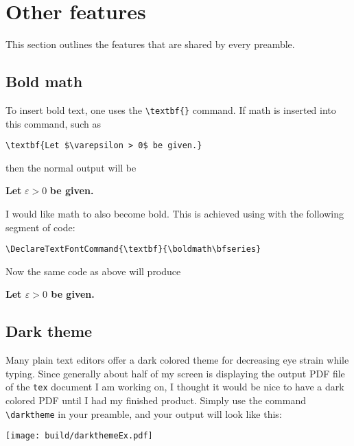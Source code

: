 \documentclass[letterpaper,12pt]{article}
\begin{document}
\section{Other features}
This section outlines the features that are shared by every preamble.

	\subsection{Bold math}
	To insert bold text, one uses the \verb|\textbf{}| command. If math is inserted into this command, such as
	
	\begin{Verbatim}[frame=single,gobble=1,fontsize=\small]
	\textbf{Let $\varepsilon > 0$ be given.}
	\end{Verbatim}
	
	then the normal output will be
	
	\begin{shaded*}
	\textbf{Let} $\varepsilon > 0$ \textbf{be given.}
	\end{shaded*}
	
	I would like math to also become bold. This is achieved using with the following segment of code:
	
	\begin{Verbatim}[frame=single,gobble=1,fontsize=\small]
	\DeclareTextFontCommand{\textbf}{\boldmath\bfseries}
	\end{Verbatim}
	
	Now the same code as above will produce
	
	\begin{shaded*}
	\textbf{Let $\varepsilon > 0$ be given.}
	\end{shaded*}
	
	\subsection{Dark theme}
	Many plain text editors offer a dark colored theme for decreasing eye strain while typing. Since generally about half of my screen is displaying the output PDF file of the \texttt{tex} document I am working on, I thought it would be nice to have a dark colored PDF until I had my finished product. Simply use the command \verb|\darktheme| in your preamble, and your output will look like this:
	
	\begin{center}
	\texttt{[image: build/darkthemeEx.pdf]}
	\end{center}
	
\end{document}
